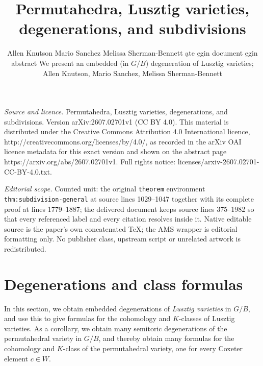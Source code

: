 \documentclass[10pt,a4paper]{amsart}
\begin{document}
\title[Permutahedra, Lusztig varieties, degenerations, and subdivis]{Permutahedra, Lusztig varieties, degenerations, and subdivisions}
\author{Allen Knutson Mario Sanchez Melissa Sherman-Bennett ạte e̱gin document e̱gin abstract We present an embedded (in $G/B$) degeneration of Lusztig varieties; Allen Knutson, Mario Sanchez, Melissa Sherman-Bennett}
\date{}
\maketitle
\noindent\emph{Source and licence.} Permutahedra, Lusztig varieties, degenerations, and subdivisions. Version arXiv:2607.02701v1 (CC BY 4.0). This material is distributed under the Creative Commons Attribution 4.0 International licence, http://creativecommons.org/licenses/by/4.0/, as recorded in the arXiv OAI licence metadata for this exact version and shown on the abstract page https://arxiv.org/abs/2607.02701v1. Full rights notice: licenses/arxiv-2607.02701-CC-BY-4.0.txt.\par\smallskip
\noindent\textit{Editorial scope.} Counted unit: the original \texttt{theorem} environment \texttt{thm:subdivision-general} at source lines 1029--1047 together with its complete proof at lines 1779--1887; the delivered document keeps source lines 375--1982 so that every referenced label and every citation resolves inside it. Native editable source is the paper's own concatenated TeX; the AMS wrapper is editorial formatting only. No publisher class, upstream script or unrelated artwork is redistributed.
\section{Degenerations and class formulas} \label{sec:degen-and-class-formulas}




In this section, we obtain embedded degenerations of \emph{Lusztig varieties}
in $G/B$, and use this to give formulas for the cohomology and
$K$-classes of Lusztig varieties. As a corollary, we obtain many
semitoric degenerations of the permutahedral variety in $G/B$, and thereby
obtain many formulas for the cohomology and $K$-class of the
permutahedral variety, one for every Coxeter element $c \in W$.
\end{document}
